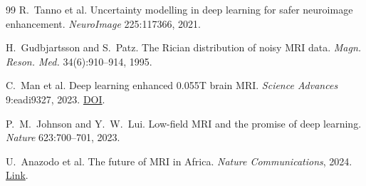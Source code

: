 \documentclass[11pt,a4paper]{article}
\begin{document}
\begin{thebibliography}{99}
 R.~Tanno et al. Uncertainty modelling in deep learning for safer neuroimage enhancement. \textit{NeuroImage} 225:117366, 2021.

 H.~Gudbjartsson and S.~Patz. The Rician distribution of noisy MRI data. \textit{Magn. Reson. Med.} 34(6):910--914, 1995.

 C.~Man et al. Deep learning enhanced 0.055T brain MRI. \textit{Science Advances} 9:eadi9327, 2023. \href{https://doi.org/10.1126/sciadv.adi9327}{DOI}.

 P.~M.~Johnson and Y.~W.~Lui. Low-field MRI and the promise of deep learning. \textit{Nature} 623:700--701, 2023.

 U.~Anazodo et al. The future of MRI in Africa. \textit{Nature Communications}, 2024. \href{https://www.nature.com/articles/s41467-024-46567-3}{Link}.

\end{thebibliography}
\end{document}
